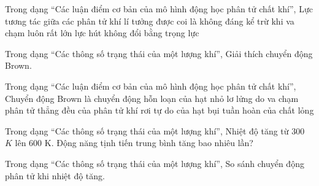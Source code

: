 \begin{ex}
Trong dạng “Các luận điểm cơ bản của mô hình động học phân tử chất khí”, Lực tương tác giữa các phân tử khí lí tưởng được coi là
\choice
{\True không đáng kể trừ khi va chạm}
{luôn rất lớn}
{lực hút không đổi}
{bằng trọng lực}
\end{ex}

\begin{ex}
Trong dạng “Các thông số trạng thái của một lượng khí”, Giải thích chuyển động Brown.
\choiceTF

\end{ex}

\begin{ex}
Trong dạng “Các luận điểm cơ bản của mô hình động học phân tử chất khí”, Chuyển động Brown là chuyển động
\choice
{\True hỗn loạn của hạt nhỏ lơ lửng do va chạm phân tử}
{thẳng đều của phân tử khí}
{rơi tự do của hạt bụi}
{tuần hoàn của chất lỏng}
\end{ex}

\begin{ex}
Trong dạng “Các thông số trạng thái của một lượng khí”, Nhiệt độ tăng từ 300 $K$ lên 600 K. Động năng tịnh tiến trung bình tăng bao nhiêu lần?
\end{ex}

\begin{ex}
Trong dạng “Các thông số trạng thái của một lượng khí”, So sánh chuyển động phân tử khi nhiệt độ tăng.
\choiceTF

\end{ex}

